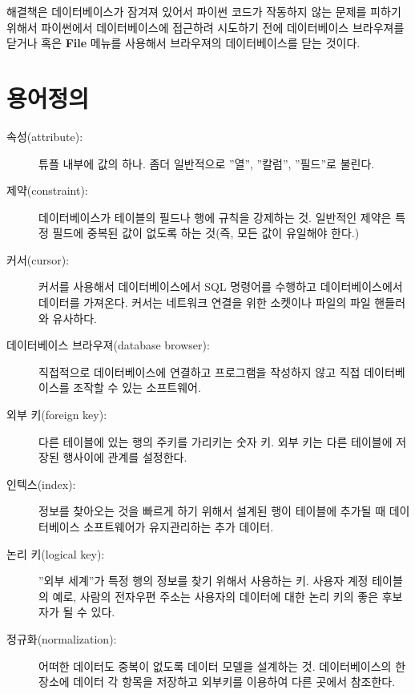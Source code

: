 해결책은 데이터베이스가 잠겨져 있어서 파이썬 코드가 작동하지 않는 문제를 피하기 위해서 파이썬에서 데이터베이스에 접근하려 시도하기 전에
데이터베이스 브라우져를 닫거나 혹은 {\bf File} 메뉴를 사용해서 브라우져의 데이터베이스를 닫는 것이다.

\section{용어정의}

\begin{description}

\item[속성(attribute):] 튜플 내부에 값의 하나. 좀더 일반적으로 ''열'', ''칼럼'', ''필드''로 불린다.

\item[제약(constraint):] 
데이터베이스가 테이블의 필드나 행에 규칙을 강제하는 것.
일반적인 제약은 특정 필드에 중복된 값이 없도록 하는 것(즉, 모든 값이 유일해야 한다.)

\item[커서(cursor):]
커서를 사용해서 데이터베이스에서 SQL 명령어를 수행하고 데이터베이스에서 데이터를 가져온다.
커서는 네트워크 연결을 위한 소켓이나 파일의 파일 핸들러와 유사하다.

\item[데이터베이스 브라우져(database browser):] 
직접적으로 데이터베이스에 연결하고 프로그램을 작성하지 않고 직접 데이터베이스를 조작할 수 있는 소프트웨어.

\item[외부 키(foreign key):]
다른 테이블에 있는 행의 주키를 가리키는 숫자 키.
외부 키는 다른 테이블에 저장된 행사이에 관계를 설정한다.

\item[인텍스(index):]
정보를 찾아오는 것을 빠르게 하기 위해서 설계된 행이 테이블에 추가될 때 데이터베이스 소프트웨어가 유지관리하는 추가 데이터.

\item[논리 키(logical key):]
''외부 세계''가 특정 행의 정보를 찾기 위해서 사용하는 키. 사용자 계정 테이블의 예로,
사람의 전자우편 주소는 사용자의 데이터에 대한 논리 키의 좋은 후보자가 될 수 있다.

\item[정규화(normalization):]
어떠한 데이터도 중복이 없도록 데이터 모델을 설계하는 것.
데이터베이스의 한 장소에 데이터 각 항목을 저장하고 외부키를 이용하여 다른 곳에서 참조한다.


\end{description}
